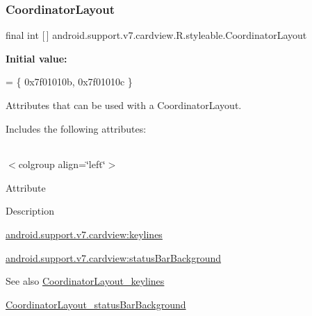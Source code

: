 \subsubsection{\texorpdfstring{Coordinator\+Layout}{CoordinatorLayout}}
{\footnotesize\ttfamily final int \mbox{[}$\,$\mbox{]} android.\+support.\+v7.\+cardview.\+R.\+styleable.\+Coordinator\+Layout\hspace{0.3cm}{\ttfamily [static]}}

{\bfseries Initial value\+:}
\begin{DoxyCode}
= \{
            0x7f01010b, 0x7f01010c
        \}
\end{DoxyCode}
Attributes that can be used with a Coordinator\+Layout. 

Includes the following attributes\+:

\tabulinesep=1mm
\begin{longtabu} spread 0pt [c]{*{0}{|X[-1]}|}
\hline
\end{longtabu}
$<$colgroup align=\char`\"{}left\char`\"{}$>$ 

Attribute

Description 

{\ttfamily \hyperlink{classandroid_1_1support_1_1v7_1_1cardview_1_1R_1_1styleable_a8eec866472a48cbeb40fe82ed1bceb74}{android.\+support.\+v7.\+cardview\+:keylines}}

{\ttfamily \hyperlink{classandroid_1_1support_1_1v7_1_1cardview_1_1R_1_1styleable_a3e4084475fab0e54b108b676c93f7eb7}{android.\+support.\+v7.\+cardview\+:status\+Bar\+Background}}

\begin{DoxySeeAlso}{See also}
\hyperlink{classandroid_1_1support_1_1v7_1_1cardview_1_1R_1_1styleable_a8eec866472a48cbeb40fe82ed1bceb74}{Coordinator\+Layout\+\_\+keylines} 

\hyperlink{classandroid_1_1support_1_1v7_1_1cardview_1_1R_1_1styleable_a3e4084475fab0e54b108b676c93f7eb7}{Coordinator\+Layout\+\_\+status\+Bar\+Background} 
\end{DoxySeeAlso}
\mbox{\label{classandroid_1_1support_1_1v7_1_1cardview_1_1R_1_1styleable_a8eec866472a48cbeb40fe82ed1bceb74}} 

